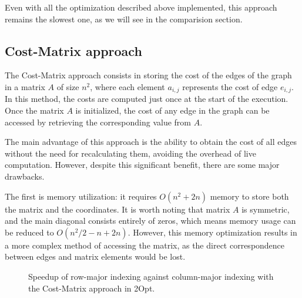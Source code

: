 Even with all the optimization described above implemented, this approach remains the slowest one, as we will see in the comparision section.

\subsection{Cost-Matrix approach}

The Cost-Matrix approach consists in storing the cost of the edges of the graph in a matrix $A$ of size $n^2$, where each element $a_{i,j}$ represents the cost of edge $e_{i,j}$.
In this method, the costs are computed just once at the start of the execution.
Once the matrix $A$ is initialized, the cost of any edge in the graph can be accessed by retrieving the corresponding value from $A$.

The main advantage of this approach is the ability to obtain the cost of all edges without the need for recalculating them, avoiding the overhead of live computation.
However, despite this significant benefit, there are some major drawbacks.

The first is memory utilization: it requires $O(n^2 + 2n)$ memory to store both the matrix and the coordinates.
It is worth noting that matrix $A$ is symmetric, and the main diagonal consists entirely of zeros, which means memory usage can be reduced to $O(n^2/2-n+2n)$.
However, this memory optimization results in a more complex method of accessing the matrix, as the direct correspondence between edges and matrix elements would be lost.

\begin{figure}[htbp]
    \centering
    \caption{Speedup of row-major indexing against column-major indexing with the Cost-Matrix approach in 2Opt.} \label{fig:matrixBadIndex}
\end{figure}

